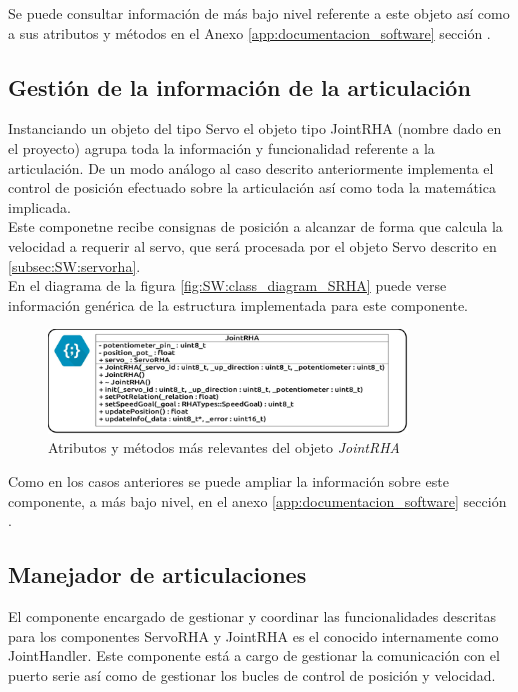         Se puede consultar información de más bajo nivel referente a este objeto así como a sus atributos y métodos en el Anexo \ref{app:documentacion_software} sección \completar.

    \subsection{Gestión de la información de la articulación} \label{subsec:SW:jointrha}
        Instanciando un objeto del tipo Servo el objeto tipo JointRHA (nombre dado en el proyecto) agrupa toda la información y funcionalidad referente a la articulación. De un modo análogo al caso descrito anteriormente implementa el control de posición efectuado sobre la articulación así como toda la matemática implicada.
        \\
        Este componetne recibe consignas de posición a alcanzar de forma que calcula la velocidad a requerir al servo, que será procesada por el objeto Servo descrito en \ref{subsec:SW:servorha}.
        \\
        En el diagrama de la figura \ref{fig:SW:class_diagram_SRHA} puede verse información genérica de la estructura implementada para este componente.
        \begin{figure}[H]
            \centering
            \includegraphics[width=0.85\textwidth]{figuras/Imagenes_SW/class_diagram_JRHA.jpg}
            \caption{Atributos y métodos más relevantes del objeto \textit{JointRHA} }
            \label{fig:SW:class_diagram_JRHA}
        \end{figure}

        Como en los casos anteriores se puede ampliar la información sobre este componente, a más bajo nivel, en el anexo \ref{app:documentacion_software} sección \completar.
    \subsection{Manejador de articulaciones} \label{subsec:SW:joint_handler}
        El componente encargado de gestionar y coordinar las funcionalidades descritas para los componentes ServoRHA y JointRHA es el conocido internamente como JointHandler. Este componente está a cargo de gestionar la comunicación con el puerto serie así como de gestionar los bucles de control de posición y velocidad.
        \\
        
